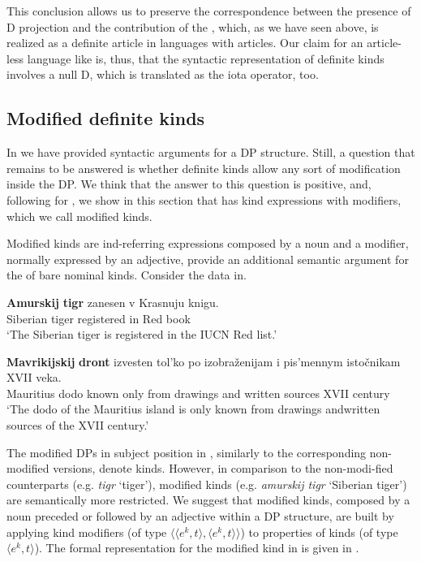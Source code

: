 \documentclass[output=paper
,modfonts
,nonflat]{langsci/langscibook}
\begin{document}
	This conclusion allows us to preserve the correspondence between the presence of D projection and the contribution of the , which, as we have seen above, is realized as a definite article in languages with articles. Our claim for an article-less language like  is, thus, that the syntactic representation of definite kinds involves a null D, which is translated as the iota operator, too. 
	
	\subsection{Modified definite kinds} \label{sec:borik:3.3}
	
	In  we have provided syntactic arguments for a DP structure. Still, a question that remains to be answered is whether definite kinds allow any sort of modification inside the DP. We think that the answer to this question is positive, and, following \citet{Borik2015} for , we show in this section that  has kind expressions with modifiers, which we call modified kinds. 
	
	Modified kinds are ind-referring expressions composed by a noun and a modifier, normally expressed by an adjective, provide an additional semantic argument for the  of  bare nominal kinds. Consider the data in\largerpage {}.
	
	\ea\label{ex:borik:26}
	\ea\label{ex:borik:26a}{
		\gll \textbf{Amurskij} 	\textbf{tigr} 	zanesen	 v Krasnuju 	knigu.\\ 			
		Siberian 	tiger 	registered 	in Red 			book\\
		\glt `The Siberian tiger is registered in the IUCN Red list.'
	}
	
	\ex{}\label{ex:borik:26b}{
		\gll \textbf{Mavrikijskij} \textbf{dront} izvesten tol'ko 	po izobra\v{z}enijam 	i pis'mennym isto\v{c}nikam XVII veka.\\
		Mauritius	dodo	known only	from	drawings 		and	written sources 	XVII century\\
		\glt `The dodo of the Mauritius island is only known from drawings and\largerpage written sources of the XVII century.'
	}
	\z
	\z
	
	The modified DPs in subject position in , similarly to the corresponding non\hyp{}modified versions, denote kinds. However, in comparison to the non-modi\hyp{}fied counterparts (e.g. \textit{tigr} `tiger'), modified kinds (e.g. \textit{amurskij tigr} `Siberian tiger') are semantically more restricted. We suggest that modified kinds, composed by a noun preceded or followed by an adjective within a DP structure, are built by applying kind modifiers (of type $\langle \langle e^k, t\rangle, \langle e^k, t\rangle\rangle$) to  properties of kinds (of type $\langle e^k, t\rangle$). The formal representation for the modified kind in  is given in .
	
\end{document}
